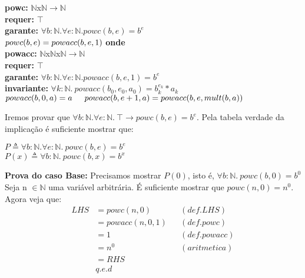 \documentclass{article}
\begin{document}
\noindent \textbf{powc:} $\mathbb{N}$x$\mathbb{N}$$ \rightarrow \mathbb{N}$\\
\textbf{requer:} $\top$\\
\textbf{garante:} $\forall b:\mathbb{N}. \forall e:\mathbb{N}. powc(b, e) = b^e$\\
$powc(b, e) = powacc(b, e, 1)\\$
\textbf{onde}\\
\indent \textbf{powacc:} $\mathbb{N}$x$\mathbb{N}$x$\mathbb{N}$$ \rightarrow \mathbb{N}$\\
\indent \textbf{requer:} $\top$\\
\indent \textbf{garante:} $\forall b:\mathbb{N}. \forall e:\mathbb{N}. powacc(b, e, 1) = b^e$\\
\indent \textbf{invariante:} $\forall k:\mathbb{N}.\: powacc(b_0,e_0,a_0) = b_k^{e_k}*a_k$\\
\indent $powacc(b, 0, a) = a\\
\indent powacc(b, e+1, a) = powacc(b, e, mult(b, a))\\$


\noindent Iremos provar que $\forall b:\mathbb{N}.\forall e:\mathbb{N}.\: \top \rightarrow powc(b, e) = b^e$. Pela tabela verdade da implicação é suficiente mostrar que:\\
\begin{center}
$P \triangleq \forall b:\mathbb{N}.\forall e:\mathbb{N}.\: powc(b, e) = b^e$\\
$P(x) \triangleq \forall b:\mathbb{N}.\: powc(b, x) = b^x$
\end{center}

\noindent\textbf{Prova do caso Base:} Precisamos mostrar $P(0)$, isto é,
$\forall b:\mathbb{N}.\: powc(b, 0) = b^0$\\
Seja n $\in \mathbb{N}$ uma variável arbitrária. É suficiente mostrar que $powc(n, 0) = n^0$.\\
Agora veja que:
\begin{align*}
LHS &= powc(n, 0) && (def. LHS)\\
&= powacc(n, 0, 1) && (def. powc)\\
&= 1 && (def. powacc)\\
&= n^0 && (aritmetica)\\
&= RHS\\
& q.e.d
\end{align*}
\end{document}
